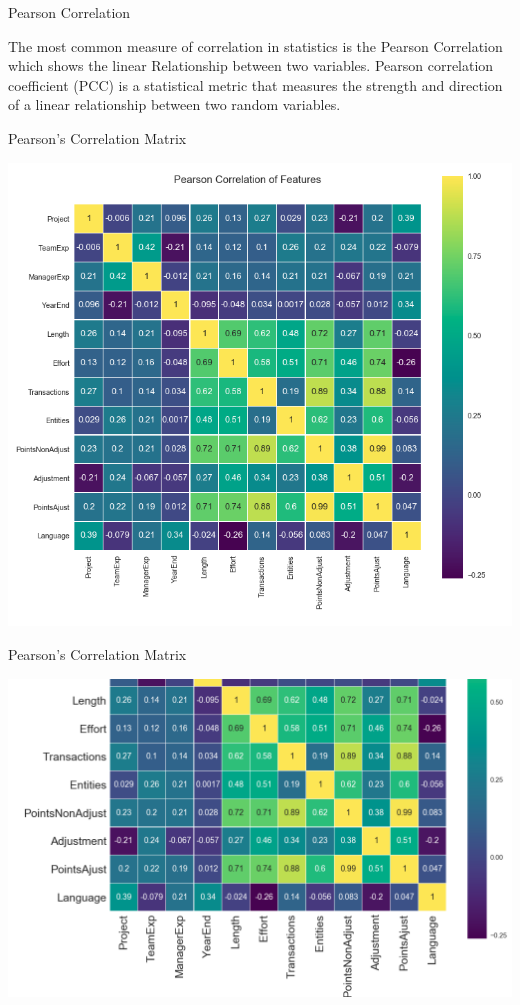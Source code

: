 \documentclass{beamer}
\begin{document}
\begin{frame}{Pearson Correlation}
	\begin{block}{}
	The most common measure of correlation in statistics is the Pearson Correlation which shows the linear Relationship between two variables. Pearson correlation coefficient (PCC) is a statistical metric that measures the strength and direction of a linear relationship between two random variables.
	\end{block}
\end{frame}

\begin{frame}{Pearson's Correlation Matrix}
		 \begin{block}{}
			\begin{center}
				\includegraphics[height=2.6 in]{img/pearsons_correlation_matrix.png}
			\end{center}
		 \end{block}
\end{frame}

\begin{frame}{Pearson's Correlation Matrix}
		 \begin{block}{}
			\begin{center}
				\includegraphics[height=2.6 in]{img/pearsons_correlation_matrix_sliced.png}
			\end{center}
		 \end{block}
\end{frame}
\end{document}
